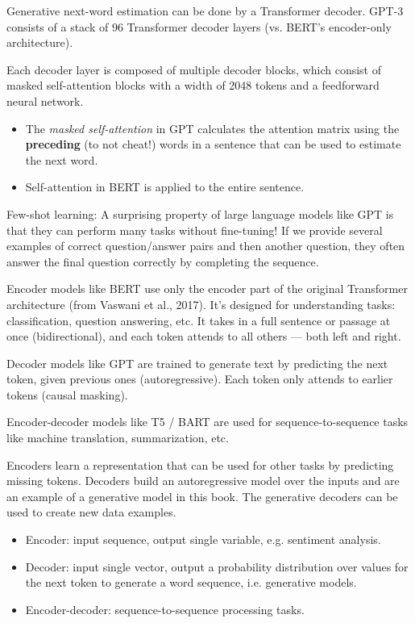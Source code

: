 Generative next-word estimation can be done by a Transformer decoder.
GPT-3 consists of a stack of 96 Transformer decoder layers
(vs. BERT's encoder-only architecture).

Each decoder layer is composed of multiple decoder blocks,
which consist of masked self-attention blocks with a width of 2048 tokens
and a feedforward neural network.

\begin{itemize}
    \item The \textit{masked self-attention} in GPT calculates the attention matrix using the
          \textbf{preceding} (to not cheat!) words in a sentence that can be used to estimate the next word.
    \item Self-attention in BERT is applied to the entire sentence.
\end{itemize}

Few-shot learning: A surprising property of large language models like GPT is that they can perform many tasks without fine-tuning!
If we provide several examples of correct question/answer pairs
and then another question, they often answer the final question correctly by completing
the sequence.

Encoder models like BERT use only the encoder part of the original Transformer architecture (from Vaswani et al., 2017).
It's designed for understanding tasks: classification, question answering, etc.
It takes in a full sentence or passage at once (bidirectional), and each token attends to all others — both left and right.

Decoder models like GPT are trained to generate text by predicting the next token, given previous ones (autoregressive).
Each token only attends to earlier tokens (causal masking).

Encoder-decoder models like T5 / BART are used for sequence-to-sequence tasks like machine translation, summarization, etc.

Encoders learn a representation that can be used for other tasks by predicting missing tokens.
Decoders build an autoregressive model over the inputs and are an example of a generative model in this book.
The generative decoders can be used to create new data examples.

\begin{itemize}
    \item Encoder: input sequence, output single variable, e.g. sentiment analysis.
    \item Decoder: input single vector, output a probability distribution over values for the next token to generate a word sequence, i.e. generative models.
    \item Encoder-decoder: sequence-to-sequence processing tasks.
\end{itemize}

